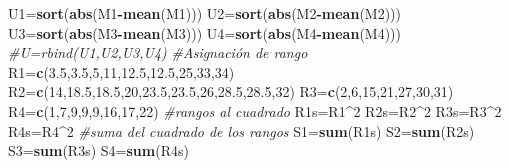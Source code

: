 \documentclass[
  a4paper,
  oneside,
  openany]{book}
\newenvironment{Shaded}{\begin{snugshade}}{\end{snugshade}}
\newcommand{\CommentTok}[1]{\textcolor[rgb]{0.56,0.35,0.01}{\textit{#1}}}
\newcommand{\DecValTok}[1]{\textcolor[rgb]{0.00,0.00,0.81}{#1}}
\newcommand{\FloatTok}[1]{\textcolor[rgb]{0.00,0.00,0.81}{#1}}
\newcommand{\FunctionTok}[1]{\textcolor[rgb]{0.13,0.29,0.53}{\textbf{#1}}}
\newcommand{\NormalTok}[1]{#1}
\newcommand{\OtherTok}[1]{\textcolor[rgb]{0.56,0.35,0.01}{#1}}
\newcommand{\SpecialCharTok}[1]{\textcolor[rgb]{0.81,0.36,0.00}{\textbf{#1}}}
\begin{document}
\begin{Shaded}
\begin{Highlighting}[]
\NormalTok{U1}\OtherTok{=}\FunctionTok{sort}\NormalTok{(}\FunctionTok{abs}\NormalTok{(M1}\SpecialCharTok{{-}}\FunctionTok{mean}\NormalTok{(M1)))}
\NormalTok{U2}\OtherTok{=}\FunctionTok{sort}\NormalTok{(}\FunctionTok{abs}\NormalTok{(M2}\SpecialCharTok{{-}}\FunctionTok{mean}\NormalTok{(M2)))}
\NormalTok{U3}\OtherTok{=}\FunctionTok{sort}\NormalTok{(}\FunctionTok{abs}\NormalTok{(M3}\SpecialCharTok{{-}}\FunctionTok{mean}\NormalTok{(M3)))}
\NormalTok{U4}\OtherTok{=}\FunctionTok{sort}\NormalTok{(}\FunctionTok{abs}\NormalTok{(M4}\SpecialCharTok{{-}}\FunctionTok{mean}\NormalTok{(M4)))}
\CommentTok{\#U=rbind(U1,U2,U3,U4)}
\CommentTok{\#Asignación de rango}
\NormalTok{R1}\OtherTok{=}\FunctionTok{c}\NormalTok{(}\FloatTok{3.5}\NormalTok{,}\FloatTok{3.5}\NormalTok{,}\DecValTok{5}\NormalTok{,}\DecValTok{11}\NormalTok{,}\FloatTok{12.5}\NormalTok{,}\FloatTok{12.5}\NormalTok{,}\DecValTok{25}\NormalTok{,}\DecValTok{33}\NormalTok{,}\DecValTok{34}\NormalTok{)}
\NormalTok{R2}\OtherTok{=}\FunctionTok{c}\NormalTok{(}\DecValTok{14}\NormalTok{,}\FloatTok{18.5}\NormalTok{,}\FloatTok{18.5}\NormalTok{,}\DecValTok{20}\NormalTok{,}\FloatTok{23.5}\NormalTok{,}\FloatTok{23.5}\NormalTok{,}\DecValTok{26}\NormalTok{,}\FloatTok{28.5}\NormalTok{,}\FloatTok{28.5}\NormalTok{,}\DecValTok{32}\NormalTok{)}
\NormalTok{R3}\OtherTok{=}\FunctionTok{c}\NormalTok{(}\DecValTok{2}\NormalTok{,}\DecValTok{6}\NormalTok{,}\DecValTok{15}\NormalTok{,}\DecValTok{21}\NormalTok{,}\DecValTok{27}\NormalTok{,}\DecValTok{30}\NormalTok{,}\DecValTok{31}\NormalTok{)}
\NormalTok{R4}\OtherTok{=}\FunctionTok{c}\NormalTok{(}\DecValTok{1}\NormalTok{,}\DecValTok{7}\NormalTok{,}\DecValTok{9}\NormalTok{,}\DecValTok{9}\NormalTok{,}\DecValTok{9}\NormalTok{,}\DecValTok{16}\NormalTok{,}\DecValTok{17}\NormalTok{,}\DecValTok{22}\NormalTok{)}
\CommentTok{\#rangos al cuadrado}
\NormalTok{R1s}\OtherTok{=}\NormalTok{R1}\SpecialCharTok{\^{}}\DecValTok{2}
\NormalTok{R2s}\OtherTok{=}\NormalTok{R2}\SpecialCharTok{\^{}}\DecValTok{2}
\NormalTok{R3s}\OtherTok{=}\NormalTok{R3}\SpecialCharTok{\^{}}\DecValTok{2}
\NormalTok{R4s}\OtherTok{=}\NormalTok{R4}\SpecialCharTok{\^{}}\DecValTok{2}
\CommentTok{\#suma del cuadrado de los rangos}
\NormalTok{S1}\OtherTok{=}\FunctionTok{sum}\NormalTok{(R1s)}
\NormalTok{S2}\OtherTok{=}\FunctionTok{sum}\NormalTok{(R2s)}
\NormalTok{S3}\OtherTok{=}\FunctionTok{sum}\NormalTok{(R3s)}
\NormalTok{S4}\OtherTok{=}\FunctionTok{sum}\NormalTok{(R4s)}


\end{Highlighting}
\end{Shaded}
\end{document}
